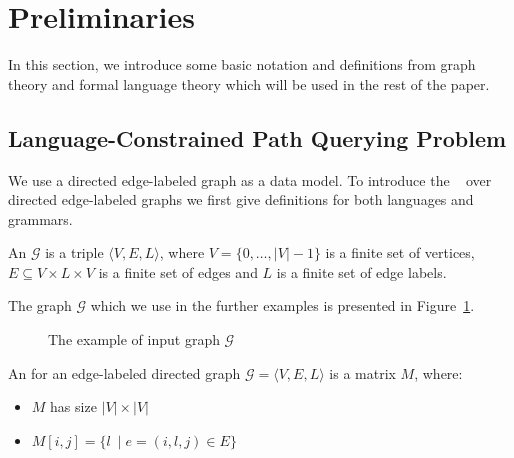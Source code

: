 \section{Preliminaries}

In this section, we introduce some basic notation and definitions from graph theory and formal language theory which will be used in the rest of the paper.

\subsection{Language-Constrained Path Querying Problem}

We use a directed edge-labeled graph as a data model.
To introduce the ~\citep{barrett2000formal} over directed edge-labeled graphs we first give definitions for both languages and grammars.

\begin{definition}
An  $\mathcal{G}$ is a triple $\langle V,E,L \rangle$, where $V = \{0, \ldots, |V|-1\}$ is a finite set of vertices, $E \subseteq V \times L \times V$ is a finite set of edges and $L$ is a finite set of edge labels.
\end{definition}

The graph  $\mathcal{G}$  which we use in the further examples is presented in Figure~\ref{fig:example_input_graph}.

\begin{figure}[h!]
    \centering
    \caption{The example of input graph $\mathcal{G}$}
    \label{fig:example_input_graph}
\end{figure}

\begin{definition}
An  for an edge-labeled directed graph $\mathcal{G} = \langle V,E,L \rangle$ is a matrix $M$, where:
\begin{itemize}
    \item $M$ has size $|V|\times|V|$
    \item $M[i,j] = \{l~\mid e = (i,l,j) \in E\}$
\end{itemize}
\end{definition}


